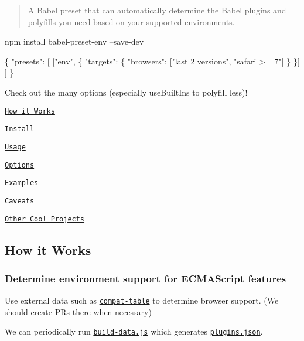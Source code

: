 \begin{quote}
A Babel preset that can automatically determine the Babel plugins and polyfills you need based on your supported environments. \end{quote}



\begin{DoxyCode}
npm install babel-preset-env --save-dev
\end{DoxyCode}



\begin{DoxyCode}
\{
  "presets": [
    ["env", \{
      "targets": \{
        "browsers": ["last 2 versions", "safari >= 7"]
      \}
    \}]
  ]
\}
\end{DoxyCode}


Check out the many options (especially {\ttfamily use\+Built\+Ins} to polyfill less)!


\begin{DoxyItemize}
\item \href{#how-it-works}{\tt How it Works}
\item \href{#install}{\tt Install}
\item \href{#usage}{\tt Usage}
\item \href{#options}{\tt Options}
\item \href{#examples}{\tt Examples}
\item \href{#caveats}{\tt Caveats}
\item \href{#other-cool-projects}{\tt Other Cool Projects}
\end{DoxyItemize}

\subsection*{How it Works}

\subsubsection*{Determine environment support for E\+C\+M\+A\+Script features}

Use external data such as \href{https://github.com/kangax/compat-table}{\tt {\ttfamily compat-\/table}} to determine browser support. (We should create P\+Rs there when necessary)



We can periodically run \href{https://github.com/babel/babel-preset-env/blob/master/scripts/build-data.js}{\tt build-\/data.\+js} which generates \href{https://github.com/babel/babel-preset-env/blob/master/data/plugins.json}{\tt plugins.\+json}.

